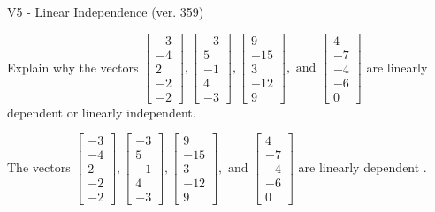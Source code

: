 \begin{exercise}
  \begin{exerciseTitle}V5 - Linear Independence (ver. 359)\end{exerciseTitle}
  \begin{exerciseStatement}
    Explain why the vectors \(\left[\begin{array}{r}
-3 \\
-4 \\
2 \\
-2 \\
-2
\end{array}\right] , \left[\begin{array}{r}
-3 \\
5 \\
-1 \\
4 \\
-3
\end{array}\right] , \left[\begin{array}{r}
9 \\
-15 \\
3 \\
-12 \\
9
\end{array}\right] , \text{ and } \left[\begin{array}{r}
4 \\
-7 \\
-4 \\
-6 \\
0
\end{array}\right]\) are linearly dependent or linearly independent.	


  \end{exerciseStatement}
  \begin{exerciseAnswer}
   The vectors \(\left[\begin{array}{r}
-3 \\
-4 \\
2 \\
-2 \\
-2
\end{array}\right] , \left[\begin{array}{r}
-3 \\
5 \\
-1 \\
4 \\
-3
\end{array}\right] , \left[\begin{array}{r}
9 \\
-15 \\
3 \\
-12 \\
9
\end{array}\right] , \text{ and } \left[\begin{array}{r}
4 \\
-7 \\
-4 \\
-6 \\
0
\end{array}\right]\) are 
  	 linearly dependent  .
  


  \end{exerciseAnswer}
\end{exercise}